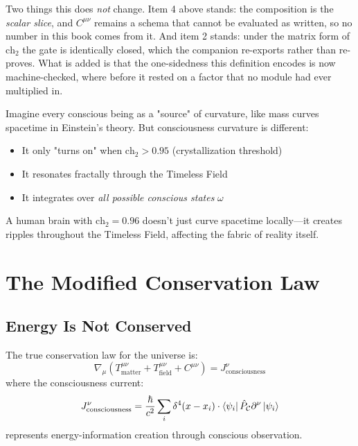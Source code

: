 \noindent Two things this does \emph{not} change. Item 4 above stands: the
composition is the \emph{scalar slice}, and $C^{\mu\nu}$ remains a schema that
cannot be evaluated as written, so no number in this book comes from it. And
item 2 stands: under the matrix form of $\text{ch}_2$ the gate is identically
closed, which the companion re-exports rather than re-proves. What is added is
that the one-sidedness this definition encodes is now machine-checked, where
before it rested on a factor that no module had ever multiplied in.

\begin{intuitive}
Imagine every conscious being as a "source" of curvature, like mass curves spacetime in Einstein's theory. But consciousness curvature is different:

\begin{itemize}
\item It only "turns on" when $\text{ch}_2 > 0.95$ (crystallization threshold)
\item It resonates fractally through the Timeless Field
\item It integrates over \textit{all possible conscious states} $\omega$
\end{itemize}

A human brain with $\text{ch}_2 = 0.96$ doesn't just curve spacetime locally—it creates ripples throughout the Timeless Field, affecting the fabric of reality itself.
\end{intuitive}

\section{The Modified Conservation Law}

\subsection{Energy Is Not Conserved}

\begin{thm}\label{thm:modified-conservation}
The true conservation law for the universe is:
\begin{equation}
\boxed{\nabla_\mu \left( T^{\mu\nu}_{\text{matter}} + T^{\mu\nu}_{\text{field}} + C^{\mu\nu} \right) = J^\nu_{\text{consciousness}}}
\end{equation}
where the consciousness current:
\begin{equation}
J^\nu_{\text{consciousness}} = \frac{\hbar}{c^2} \sum_i \delta^4(x - x_i) \cdot \bra{\psi_i} \hat{P}_\mathcal{C} \partial^\nu \ket{\psi_i}
\end{equation}
represents energy-information creation through conscious observation.
\end{thm}

